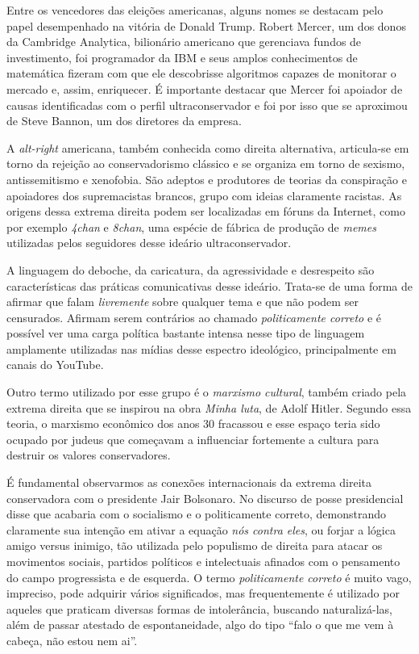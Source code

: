 Entre os vencedores das eleições americanas, alguns nomes se destacam
pelo papel desempenhado na vitória de Donald Trump. Robert Mercer, um
dos donos da Cambridge Analytica, bilionário americano que gerenciava
fundos de investimento, foi programador da IBM e seus amplos
conhecimentos de matemática fizeram com que ele descobrisse algoritmos
capazes de monitorar o mercado e, assim, enriquecer. É importante
destacar que Mercer foi apoiador de causas identificadas com o perfil
ultraconservador e foi por isso que se aproximou de Steve Bannon, um dos
diretores da empresa.

A \textit{alt-right} americana, também conhecida como direita alternativa,
articula-se em torno da rejeição ao conservadorismo clássico e se
organiza em torno de sexismo, antissemitismo e xenofobia. São adeptos e
produtores de teorias da conspiração e apoiadores dos supremacistas
brancos, grupo com ideias claramente racistas. As origens dessa extrema
direita podem ser localizadas em fóruns da Internet, como por exemplo
\textit{4chan} e \textit{8chan}, uma espécie de fábrica de produção de \textit{memes} utilizadas
pelos seguidores desse ideário ultraconservador.

A linguagem do deboche, da caricatura, da agressividade e desrespeito
são características das práticas comunicativas desse ideário. Trata-se
de uma forma de afirmar que falam \textit{livremente} sobre qualquer tema e
que não podem ser censurados. Afirmam serem contrários ao chamado
\textit{politicamente correto} e é possível ver uma carga política bastante
intensa nesse tipo de linguagem amplamente utilizadas nas mídias desse
espectro ideológico, principalmente em canais do YouTube.

Outro termo utilizado por esse grupo é o \textit{marxismo cultural}, também
criado pela extrema direita que se inspirou na obra \textit{Minha luta},
de Adolf Hitler. Segundo essa teoria, o marxismo econômico dos anos 30
fracassou e esse espaço teria sido ocupado por judeus que começavam a
influenciar fortemente a cultura para destruir os valores conservadores.

É fundamental observarmos as conexões internacionais da extrema direita
conservadora com o presidente Jair Bolsonaro. No discurso de posse
presidencial disse que acabaria com o socialismo e o politicamente
correto, demonstrando claramente sua intenção em ativar a equação \textit{nós
contra eles}, ou forjar a lógica amigo versus inimigo, tão utilizada
pelo populismo de direita para atacar os movimentos sociais, partidos
políticos e intelectuais afinados com o pensamento do campo progressista
e de esquerda. O termo \textit{politicamente correto} é muito vago,
impreciso, pode adquirir vários significados, mas frequentemente é
utilizado por aqueles que praticam diversas formas de intolerância,
buscando naturalizá-las, além de passar atestado de espontaneidade, algo
do tipo ``falo o que me vem à cabeça, não estou nem ai''.

